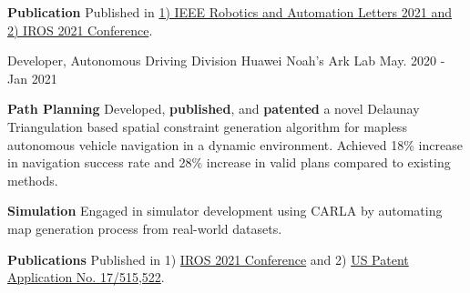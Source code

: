 \begin{cventries}
{\begin{cvitems}
{			}
			\item {
				\textbf{Publication} Published in \href{https://ieeexplore.ieee.org/document/9468918}{1) IEEE Robotics and Automation Letters 2021 and 2) IROS 2021 Conference}.
			}
		\end{cvitems}
	}
	\cventry
	{Developer, Autonomous Driving Division}
	{Huawei Noah’s Ark Lab}
	{May. 2020 - Jan 2021}
	{}
	{
		\begin{cvitems}
			\item {
				\textbf{Path Planning} Developed, \textbf{published}, and \textbf{patented} a novel Delaunay Triangulation based spatial constraint generation algorithm for mapless autonomous vehicle navigation in a dynamic environment. Achieved 18\% increase in navigation success rate and 28\% increase in valid plans compared to existing methods.
			}
			\item {
				\textbf{Simulation} Engaged in simulator development using CARLA by automating map generation process from real-world datasets.
			}
			\item{
				\textbf{Publications} Published in 1) \href{https://ieeexplore.ieee.org/document/9636067}{IROS 2021 Conference} and 2) \href{https://patents.google.com/patent/US20220135068A1/en}{US Patent Application No. 17/515,522}.
			}
		\end{cvitems}
}
\end{cventries}
